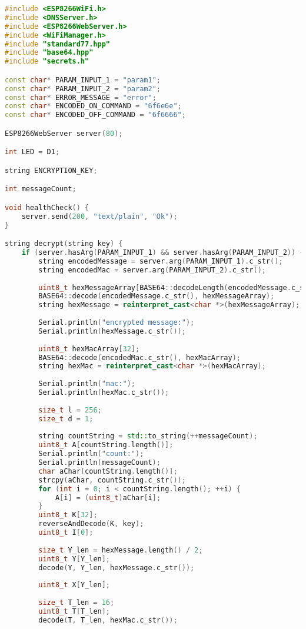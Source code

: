 \begin{lstlisting}[language=C++,label=esp-code]
#include <ESP8266WiFi.h>
#include <DNSServer.h>
#include <ESP8266WebServer.h>
#include <WiFiManager.h>
#include "standard77.hpp"
#include "base64.hpp"
#include "secrets.h"

const char* PARAM_INPUT_1 = "param1";
const char* PARAM_INPUT_2 = "param2";
const char* ERROR_MESSAGE = "error";
const char* ENCODED_ON_COMMAND = "6f6e6e";
const char* ENCODED_OFF_COMMAND = "6f6666";

ESP8266WebServer server(80);

int LED = D1;

string ENCRYPTION_KEY;

int messageCount;

void healthCheck() {
	server.send(200, "text/plain", "Ok");
}

string decrypt(string key) {
	if (server.hasArg(PARAM_INPUT_1) && server.hasArg(PARAM_INPUT_2)) {
		string encodedMessage = server.arg(PARAM_INPUT_1).c_str();
		string encodedMac = server.arg(PARAM_INPUT_2).c_str();
		
		uint8_t hexMessageArray[BASE64::decodeLength(encodedMessage.c_str())];
		BASE64::decode(encodedMessage.c_str(), hexMessageArray);
		string hexMessage = reinterpret_cast<char *>(hexMessageArray);
		
		Serial.println("encrypted message:");
		Serial.println(hexMessage.c_str());
		
		uint8_t hexMacArray[32];
		BASE64::decode(encodedMac.c_str(), hexMacArray);
		string hexMac = reinterpret_cast<char *>(hexMacArray); 
		
		Serial.println("mac:");
		Serial.println(hexMac.c_str());
		
		size_t l = 256;
		size_t d = 1;
		
		string countString = std::to_string(++messageCount);
		uint8_t A[countString.length()];
		Serial.println("count:");
		Serial.println(messageCount);
		char aChar[countString.length()];
		strcpy(aChar, countString.c_str());
		for (int i = 0; i < countString.length(); ++i) {
			A[i] = (uint8_t)aChar[i];
		}
		uint8_t K[32];
		reverseAndDecode(K, key);
		uint8_t I[0];
		
		size_t Y_len = hexMessage.length() / 2;
		uint8_t Y[Y_len];
		decode(Y, Y_len, hexMessage.c_str());
		
		uint8_t X[Y_len];
		
		size_t T_len = 16;
		uint8_t T[T_len];
		decode(T, T_len, hexMac.c_str());
		

\end{lstlisting}

